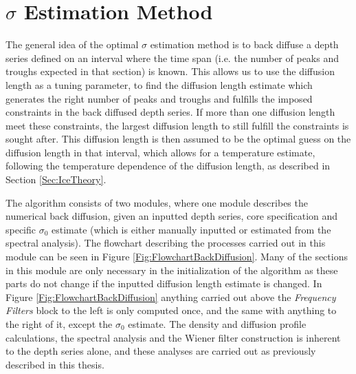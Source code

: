 \documentclass[../../CompleteThesis2/Complete_2ndDraft]{subfiles}
\begin{document}
\section[$\sigma$ Estimation Method][$\sigma$ Estimation Method]{$\sigma$ Estimation Method}
\label{Sec:Method_SigmaMethod}


The general idea of the optimal $\sigma$ estimation method is to back diffuse a depth series defined on an interval where the time span (i.e. the number of peaks and troughs expected in that section) is known. This allows us to use the diffusion length as a tuning parameter, to find the diffusion length estimate which generates the right number of peaks and troughs and fulfills the imposed constraints in the back diffused depth series. If more than one diffusion length meet these constraints, the largest diffusion length to still fulfill the constraints is sought after. This diffusion length is then assumed to be the optimal guess on the diffusion length in that interval, which allows for a temperature estimate, following the temperature dependence of the diffusion length, as described in Section \ref{Sec:IceTheory}.

The algorithm consists of two modules, where one module describes the numerical back diffusion, given an inputted depth series, core specification and specific $\sigma_0$ estimate (which is either manually inputted or estimated from the spectral analysis). The flowchart describing the processes carried out in this module can be seen in Figure \ref{Fig:FlowchartBackDiffusion}. Many of the sections in this module are only necessary in the initialization of the algorithm as these parts do not change if the inputted diffusion length estimate is changed. In Figure \ref{Fig:FlowchartBackDiffusion} anything carried out above the \textit{Frequency Filters} block to the left is only computed once, and the same with anything to the right of it, except the $\sigma_0$ estimate. The density and diffusion profile calculations, the spectral analysis and the Wiener filter construction is inherent to the depth series alone, and these analyses are carried out as previously described in this thesis.
\end{document}

